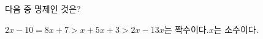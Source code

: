 다음 중 명제인 것은?
\begin{choicesii}{$2x-10=8$}{$x+7>x+5$}{$x+3>2x-1$}{$3x$는 짝수이다.}{$x$는 소수이다.}\end{choicesii}
